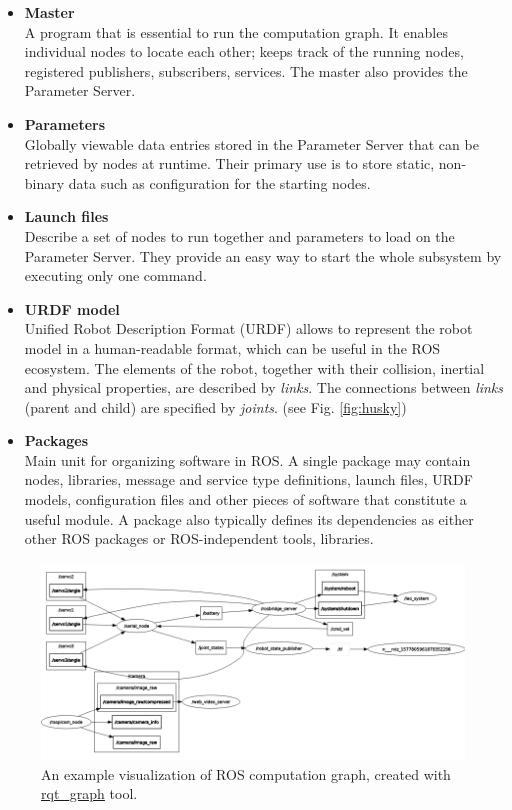 \documentclass[english,inz,shortabstract]{iithesis}
\begin{document}
\begin{itemize}
        \item \textbf{Master}\\
        A program that is essential to run the computation graph. It enables individual nodes to locate each other; keeps track of the running nodes, registered publishers, subscribers, services. The master also provides the Parameter Server.  
        \item \textbf{Parameters}\\
        Globally viewable data entries stored in the Parameter Server that can be retrieved by nodes at runtime. Their primary use is to store static, non-binary data such as configuration for the starting nodes.
        \item \textbf{Launch files}\\
        Describe a set of nodes to run together and parameters to load on the Parameter Server. They provide an easy way to start the whole subsystem by executing only one command. 
        \item \textbf{URDF model}\\
        Unified Robot Description Format (URDF) allows to represent the robot model in a human-readable format, which can be useful in the ROS ecosystem. The elements of the robot, together with their collision, inertial and physical properties, are described by \textit{links}. The connections between \textit{links} (parent and child) are specified by \textit{joints}. (see Fig. \ref{fig:husky}) 
        \item \textbf{Packages}\\
        Main unit for organizing software in ROS. A single package may contain nodes, libraries, message and service type definitions, launch files, URDF models, configuration files and other pieces of software that constitute a useful module. A package also typically defines its dependencies as either other ROS packages or ROS-independent tools, libraries.

    \end{itemize}

    \begin{figure}[ht]
        \centering
        \captionsetup{margin=2cm}
        \includegraphics[width=\textwidth]{img/rqt_graph.png}
        \caption{An example visualization of ROS computation graph, created with  \href{http://wiki.ros.org/rqt_graph}{rqt\_graph} tool.}
        \label{fig:ros_graph}
    \end{figure}
\end{document}
